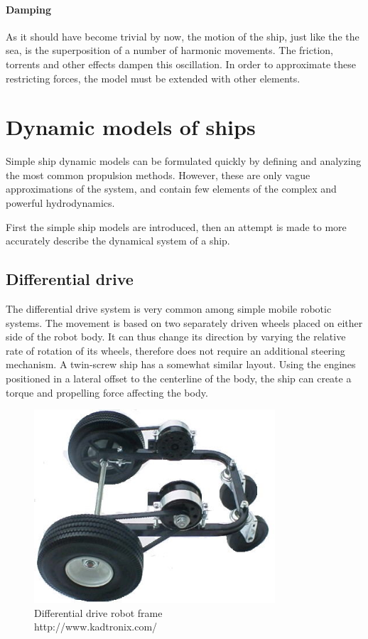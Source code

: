 \paragraph{Damping} As it should have become trivial by now, the motion of the ship, just like the the sea, is the superposition of a number of harmonic movements. The friction, torrents and other effects dampen this oscillation. In order to approximate these restricting forces, the model must be extended with other elements.

\section{Dynamic models of ships}

Simple ship dynamic models can be formulated quickly by defining and analyzing the most common propulsion methods. However, these are only vague approximations of the system, and contain few elements of the complex and powerful hydrodynamics.

First the simple ship models are introduced, then an attempt is made to more accurately describe the dynamical system of a ship.

\subsection{Differential drive}

The differential drive system is very common among simple mobile robotic systems. The movement is based on two separately driven wheels placed on either side of the robot body. It can thus change its direction by varying the relative rate of rotation of its wheels, therefore does not require an additional steering mechanism. A twin-screw ship has a somewhat similar layout. Using the engines positioned in a lateral offset to the centerline of the body, the ship can create a torque and propelling force affecting the body.

\begin{figure}[H]
	\centering
	\includegraphics[width=0.8\textwidth]{pics/kadtronixframe}
	\caption{Differential drive robot frame \\ http://www.kadtronix.com/}
	\label{fig:kadtronixframe}
\end{figure}

